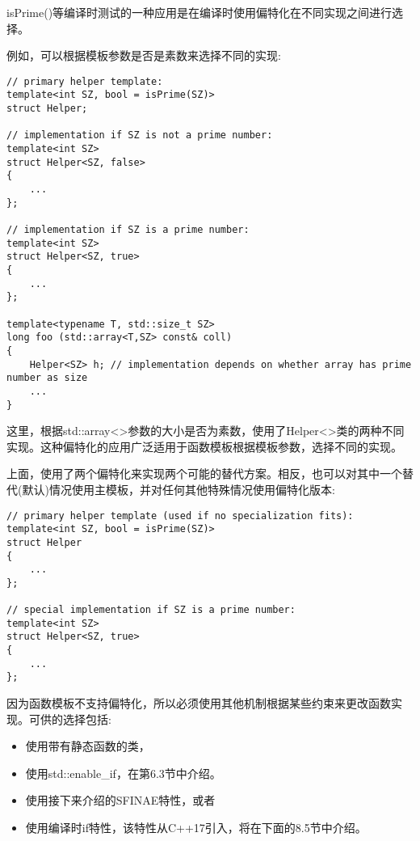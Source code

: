 isPrime()等编译时测试的一种应用是在编译时使用偏特化在不同实现之间进行选择。

例如，可以根据模板参数是否是素数来选择不同的实现:

\begin{lstlisting}[style=styleCXX]
// primary helper template:
template<int SZ, bool = isPrime(SZ)>
struct Helper;

// implementation if SZ is not a prime number:
template<int SZ>
struct Helper<SZ, false>
{
	...
};

// implementation if SZ is a prime number:
template<int SZ>
struct Helper<SZ, true>
{
	...
};

template<typename T, std::size_t SZ>
long foo (std::array<T,SZ> const& coll)
{
	Helper<SZ> h; // implementation depends on whether array has prime number as size
	...
}
\end{lstlisting}

这里，根据std::array<>参数的大小是否为素数，使用了Helper<>类的两种不同实现。这种偏特化的应用广泛适用于函数模板根据模板参数，选择不同的实现。

上面，使用了两个偏特化来实现两个可能的替代方案。相反，也可以对其中一个替代(默认)情况使用主模板，并对任何其他特殊情况使用偏特化版本:

\begin{lstlisting}[style=styleCXX]
// primary helper template (used if no specialization fits):
template<int SZ, bool = isPrime(SZ)>
struct Helper
{
	...
};

// special implementation if SZ is a prime number:
template<int SZ>
struct Helper<SZ, true>
{
	...
};
\end{lstlisting}

因为函数模板不支持偏特化，所以必须使用其他机制根据某些约束来更改函数实现。可供的选择包括:

\begin{itemize}
\item 
使用带有静态函数的类，

\item 
使用std::enable\_if，在第6.3节中介绍。

\item 
使用接下来介绍的SFINAE特性，或者

\item 
使用编译时if特性，该特性从C++17引入，将在下面的8.5节中介绍。
\end{itemize}

